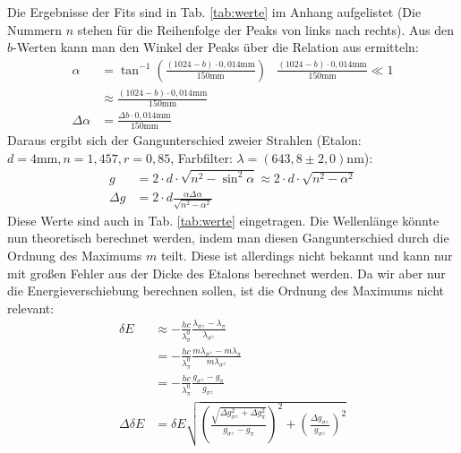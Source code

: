 Die Ergebnisse der Fits sind in Tab. \ref{tab:werte} im Anhang aufgelistet (Die Nummern $n$ stehen für die Reihenfolge der Peaks von links nach rechts). Aus den $b$-Werten kann man den Winkel der Peaks über die Relation aus \cite{praktikumsheft} ermitteln:
\begin{align*}
\alpha &= \tan^{-1}\left(\frac{(1024-b)\cdot 0,014\si{\milli\meter}}{150\si{\milli\meter}}\right) & \frac{(1024-b)\cdot 0,014\si{\milli\meter}}{150\si{\milli\meter}} \ll 1\\
&\approx \frac{(1024-b)\cdot 0,014\si{\milli\meter}}{150\si{\milli\meter}}\\
\Delta \alpha &= \frac{\Delta b\cdot 0,014\si{\milli\meter}}{150\si{\milli\meter}}
\end{align*}   
Daraus ergibt sich der Gangunterschied zweier Strahlen (Etalon: $d = 4\si{\milli\meter}, n = 1,457, r = 0,85$, Farbfilter: $\lambda = (643,8\pm 2,0) \si{\nano\meter}$):
\begin{align*}
g &= 2\cdot d \cdot \sqrt{n^2 - \sin^2{\alpha}} \approx 2\cdot d \cdot \sqrt{n^2 - \alpha^2}\\
\Delta g &= 2\cdot d \frac{\alpha \Delta\alpha}{\sqrt{n^2 - \alpha^2}}
\end{align*}
Diese Werte sind auch in Tab. \ref{tab:werte} eingetragen. Die Wellenlänge könnte nun theoretisch berechnet werden, indem man diesen Gangunterschied durch die Ordnung des Maximums $m$ teilt. Diese ist allerdings nicht bekannt und kann nur mit großen Fehler aus der Dicke des Etalons berechnet werden. Da wir aber nur die Energieverschiebung berechnen sollen, ist die Ordnung des Maximums nicht relevant:
\begin{align*}
\delta E &\approx -\frac{hc}{\lambda_\pi^0} \frac{\lambda_{\sigma^\pm} - \lambda_\pi}{\lambda_{\sigma^\pm}}\\
	&= -\frac{hc}{\lambda_\pi^0} \frac{m \lambda_{\sigma^\pm} - m \lambda_\pi}{m\lambda_{\sigma^\pm}}\\
	& = -\frac{hc}{\lambda_\pi^0} \frac{g_{\sigma^\pm} - g_\pi}{g_{\sigma^\pm}}\\
\Delta \delta E &= \delta E \sqrt{\left(\frac{\sqrt{\Delta g_{\sigma^\pm}^2 + \Delta g_\pi^2}}{g_{\sigma^\pm} - g_\pi}\right)^2 + \left(\frac{\Delta g_{\sigma^\pm}}{g_{\sigma^\pm}}\right)^2}
\end{align*}

